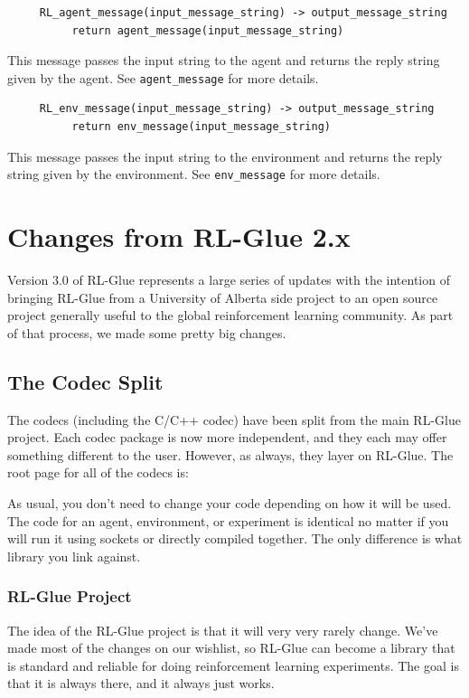 \documentclass[11pt]{article}
\begin{document}
\begin{verbatim}
     RL_agent_message(input_message_string) -> output_message_string
          return agent_message(input_message_string)
\end{verbatim}
This message passes the input string to the agent and returns the reply string given by the agent. See \texttt{agent\_message} for more details.                
\begin{verbatim}
     RL_env_message(input_message_string) -> output_message_string
          return env_message(input_message_string)
\end{verbatim}
This message passes the input string to the environment and returns the reply string given by the environment. See \texttt{env\_message} for more details. 

\section{Changes from RL-Glue 2.x}
\label{change}
Version 3.0 of RL-Glue represents a large series of updates with the intention of bringing RL-Glue from a University of Alberta side project to an open source project generally useful to the global
reinforcement learning community.  As part of that process, we made some pretty big changes.

\subsection{The Codec Split}
The codecs (including the C/C++ codec) have been split from the main RL-Glue project.  Each codec package is now more independent, and they each may offer something different to the user.  However, as always, they layer on RL-Glue.  The root page for all of the codecs is:\newline
{}

As usual, you don't need to change your code depending on how it will be used.  The code for an agent, environment, or experiment is identical no matter if you will run it using sockets or directly compiled together.  The only difference is what library you link against.

\subsubsection{RL-Glue Project}
The idea of the RL-Glue project is that it will very very rarely change.  We've made most of the changes on our wishlist, so RL-Glue can become a library that is standard and reliable for doing reinforcement learning experiments.  The goal is that it is always there, and it always just works.
\end{document}
